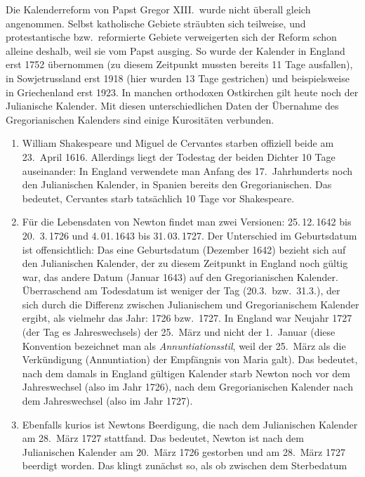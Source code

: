 Die Kalenderreform von Papst Gregor XIII.\ wurde nicht \"uberall gleich angenommen. Selbst katholische
Gebiete str\"aubten sich teilweise, und protestantische bzw.\ reformierte Gebiete verweigerten sich der
Reform schon alleine deshalb, weil sie vom Papst ausging. So wurde der Kalender in England erst 1752 
\"ubernommen (zu diesem Zeitpunkt mussten bereits 11 Tage ausfallen), in Sowjetrussland erst 1918
(hier wurden 13 Tage gestrichen) und beispielsweise in Griechenland erst 1923. In manchen 
orthodoxen Ostkirchen gilt heute noch der Julianische Kalender. Mit diesen unterschiedlichen
Daten der \"Ubernahme des Gregorianischen Kalenders sind einige Kurosit\"aten verbunden.
\begin{enumerate}
\item
William Shakespeare 
und Miguel de Cervantes starben offiziell beide am 23.\ April 1616. 
Allerdings liegt der Todestag der beiden Dichter 10 Tage auseinander: In England verwendete man Anfang
des 17.\ Jahrhunderts noch den Julianischen Kalender, in Spanien bereits den Gregorianischen. 
Das bedeutet, Cervantes starb tats\"achlich 10 Tage vor Shakespeare. 
\item
F\"ur die Lebensdaten von Newton 
findet man zwei Versionen: 25.\,12.\,1642 bis 20.\ 3.\,1726
und 4.\,01.\,1643 bis 31.\,03.\,1727. Der Unterschied im Geburtsdatum ist offensichtlich: Das eine
Geburtsdatum (Dezember 1642) bezieht sich auf den Julianischen Kalender, der zu diesem Zeitpunkt in England
noch g\"ultig war, das andere Datum (Januar 1643) auf den Gregorianischen Kalender. \"Uberraschend am
Todesdatum ist weniger der Tag (20.3.\ bzw.\ 31.3.), der sich durch die Differenz zwischen Julianischem
und Gregorianischem Kalender ergibt, als vielmehr das Jahr: 1726 bzw.\ 1727. In England war Neujahr 1727 
(der Tag es Jahreswechsels) der 25.\ M\"arz und nicht der 1.\ Januar (diese Konvention bezeichnet man
als \textit{Annuntiationsstil}, weil der 25.\ M\"arz als die Verk\"undigung (Annuntiation) der
Empf\"angnis von Maria galt). Das bedeutet, nach dem damals in England g\"ultigen
Kalender starb Newton noch vor dem Jahreswechsel (also im Jahr 1726), nach
dem Gregorianischen Kalender nach dem Jahreswechsel (also im Jahr 1727).  
\item
Ebenfalls kurios ist Newtons Beerdigung, die nach dem Julianischen Kalender am 28.\ M\"arz 1727
stattfand. Das bedeutet, Newton ist nach dem Julianischen Kalender am 20.\ M\"arz 1726 gestorben
und am 28.\ M\"arz 1727 beerdigt worden. Das klingt zun\"achst so, als ob zwischen dem Sterbedatum

\end{enumerate}

